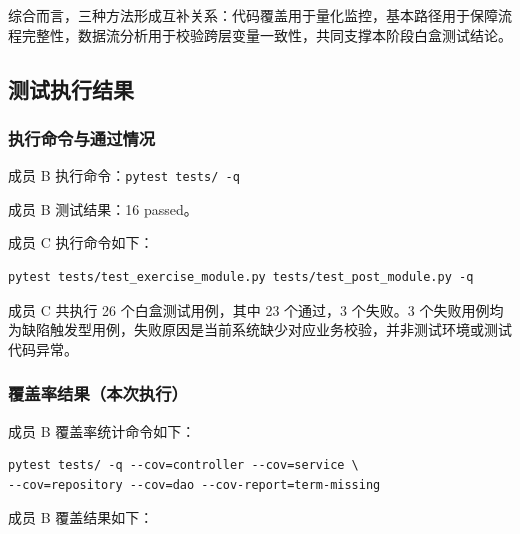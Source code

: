 \documentclass[12pt,a4paper]{ctexart}
\begin{document}
综合而言，三种方法形成互补关系：代码覆盖用于量化监控，基本路径用于保障流程完整性，数据流分析用于校验跨层变量一致性，共同支撑本阶段白盒测试结论。


\subsection{测试执行结果}

\subsubsection{执行命令与通过情况}

成员 B 执行命令：\texttt{pytest tests/ -q}

成员 B 测试结果：16 passed。

成员 C 执行命令如下：

\begin{verbatim}
pytest tests/test_exercise_module.py tests/test_post_module.py -q
\end{verbatim}

成员 C 共执行 26 个白盒测试用例，其中 23 个通过，3 个失败。3 个失败用例均为缺陷触发型用例，失败原因是当前系统缺少对应业务校验，并非测试环境或测试代码异常。

\subsubsection{覆盖率结果（本次执行）}

成员 B 覆盖率统计命令如下：

\begin{verbatim}
pytest tests/ -q --cov=controller --cov=service \
--cov=repository --cov=dao --cov-report=term-missing\end{verbatim}

成员 B 覆盖结果如下：
\end{document}
